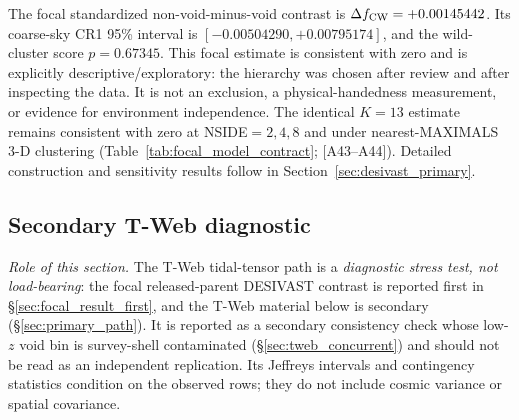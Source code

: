 \documentclass[twocolumn,linenumbers]{aastex702}
\begin{document}
The focal standardized non-void-minus-void contrast is
$\Delta f_{\rm CW}=+0.00145442$. Its coarse-sky CR1 95\% interval is
$[-0.00504290,+0.00795174]$, and the wild-cluster score $p=0.67345$.
This focal estimate is
consistent with zero and is explicitly descriptive/exploratory: the
hierarchy was chosen after review and after inspecting the data. It is
not an exclusion, a physical-handedness measurement, or evidence for
environment independence. The identical $K=13$ estimate remains consistent
with zero at NSIDE$=2,4,8$ and under nearest-MAXIMALS 3-D clustering
(Table~\ref{tab:focal_model_contract}; [A43--A44]). Detailed construction and sensitivity results
follow in Section~\ref{sec:desivast_primary}.

\subsection{Secondary T-Web diagnostic}\label{sec:results_vweb}

\emph{Role of this section.} The T-Web tidal-tensor path is a
\emph{diagnostic stress test, not load-bearing}: the focal released-parent
DESIVAST contrast is reported first in
\S\ref{sec:focal_result_first}, and the T-Web material below is
secondary (\S\ref{sec:primary_path}).
It is reported as a secondary consistency check whose
low-$z$ void bin is survey-shell contaminated (\S\ref{sec:tweb_concurrent})
and should not be read as an independent replication. Its Jeffreys
intervals and contingency statistics condition on the observed rows;
they do not include cosmic variance or spatial covariance.
\end{document}
